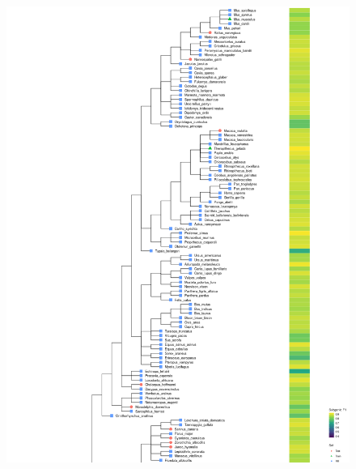 \documentclass{article}
\begin{document}
\begin{figure}[!h]
\label{supfig:phylogeny_f1_animals}
\centerline{\includegraphics[width=\textwidth]{images/animals_f1_scores_part1}}
\end{figure}
\end{document}
